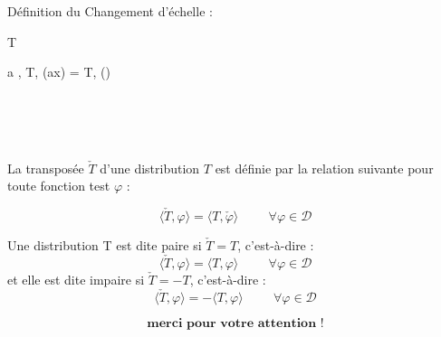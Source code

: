 \documentclass{beamer}
\begin{document}
\begin{frame}


\begin{block}{Définition du Changement d'échelle :}

 T 

\vspace{0.2cm}\hspace{2.5cm} \forall a , \quad \langle T, \varphi(ax) \rangle =  \langle T, \varphi\left(\right) \rangle
\end{block}
\\\\\\
\end{frame}


\begin{frame}
\begin{definition}
La transposée \( \check{T} \) d'une distribution \( T \) est définie par la relation suivante pour toute fonction test \( \varphi \) :

\[ \langle \check{T}, \varphi \rangle = \langle T, \check{\varphi} \rangle  \hspace{1cm} \forall \varphi \in \mathcal{D} \]

Une distribution T est dite paire si \( \check{T}  = T \), c'est-à-dire :
\[ \langle \check{T}, \varphi \rangle = \langle T, \varphi \rangle  \hspace{1cm} \forall \varphi \in \mathcal{D} \]
et elle est dite impaire si \( \check{T}  = -T \), c'est-à-dire  :
\[ \langle \check{T}, \varphi \rangle = -\langle T, \varphi \rangle  \hspace{1cm} \forall \varphi \in \mathcal{D} \]

\end{definition}


\end{frame}

\begin{frame}
\[\textbf{merci pour votre attention !}\]
\end{frame}   
\end{document}
